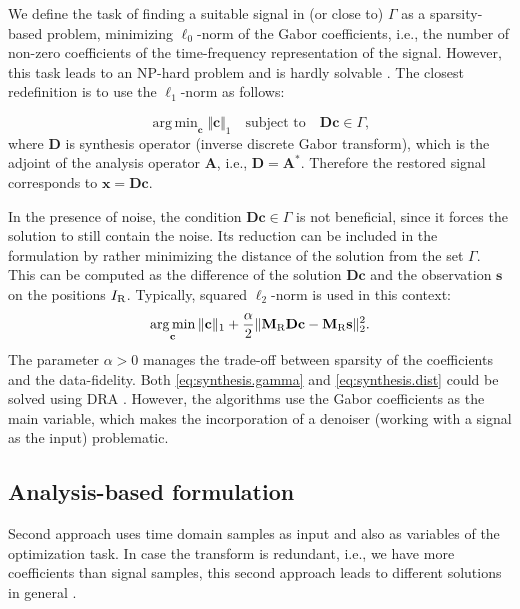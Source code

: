 \documentclass[conference]{IEEEtran}
\begin{document}
We define the task of finding a suitable signal in (or close to) $\Gamma$ as a sparsity-based problem, minimizing $ \ell_0 $-norm of the Gabor coefficients, i.e., the number of non-zero coefficients of the time-frequency representation of the signal.
However, this task leads to an NP-hard problem and is hardly solvable \cite{Mokry2020}.
The closest redefinition is to use the $ \ell_1 $-norm as follows:

\begin{equation}
	\label{eq:synthesis.gamma}
	\mathop {\operatorname{arg \, min}}_\mathbf {c}\Vert \mathbf {c}\Vert _1 \quad \text{subject to}\quad \mathbf{D}\mathbf {c}\in \Gamma,
\end{equation} 
where $\mathbf{D} $ is synthesis operator (inverse discrete Gabor transform), which is the adjoint of the analysis operator $ \mathbf{A} $, i.e., $ \mathbf{D} = \mathbf{A}^* $.
Therefore the restored signal corresponds to $ \mathbf {x} =  \mathbf{D}\mathbf {c}$.


In the presence of noise, the condition $\mathbf{D}\mathbf {c}\in \Gamma$ is not beneficial, since it forces the solution to still contain the noise.
Its reduction can be included in the formulation by rather minimizing the distance of the solution from the set $\Gamma$.
This can be computed as the difference of the solution $\mathbf{D}\mathbf{c}$ and the observation $\mathbf{s}$  on the positions $I_\textup{R}$.
Typically, squared $\ell_2$-norm is used in this context:
\begin{equation}
	\label{eq:synthesis.dist}
	\mathop {\operatorname{arg \, min}}_\mathbf {c}\Vert \mathbf {c}\Vert _1 + \frac{\alpha}{2} \Vert \mathbf{M}_{\textup{R}} \mathbf{D}\mathbf {c} - \mathbf{M}_{\textup{R}} \mathbf{s} \Vert^2_2.
\end{equation} 
The parameter $\alpha > 0$ manages the trade-off between sparsity of the coefficients and the data-fidelity.
Both \eqref{eq:synthesis.gamma} and \eqref{eq:synthesis.dist} could be solved using DRA \cite{Mokry2020, Zaviska2021}.
However, the algorithms use the Gabor coefficients as the main variable, which makes the incorporation of a denoiser (working with a signal as the input) problematic.


\subsection{Analysis-based formulation}\label{subsec:timecoef}

Second approach uses time domain samples as input and also as variables of the optimization task.
In case the transform is redundant, i.e., we have more coefficients than signal samples, this second approach leads to different solutions in general \cite{Mokry2020}. 
\end{document}
